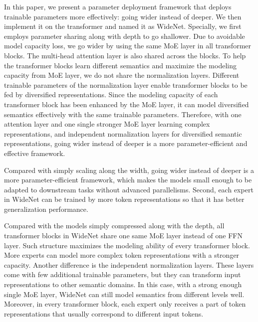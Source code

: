 \documentclass[letterpaper]{article} %
\begin{document}
In this paper, we present a parameter deployment framework that deploys trainable parameters more effectively: going wider instead of deeper. We then implement it on the transformer and named it as WideNet.  Specially, we first employs parameter sharing along with depth to go shallower. Due to avoidable model capacity loss, we go wider by using the same MoE layer in all transformer blocks. The multi-head attention layer is also shared across the blocks. To help the transformer blocks learn different semantics and maximize the modeling capacity from MoE layer, we do not share the normalization layers. Different trainable parameters of the normalization layer enable transformer blocks to be fed by diversified representations. Since the modeling capacity of each transformer block has been enhanced by the MoE layer, it can model diversified semantics effectively with the same trainable parameters. Therefore, with one attention layer and one single stronger MoE layer learning complex representations, and independent normalization layers for diversified semantic representations, going wider instead of deeper is a more parameter-efficient and effective framework. 


Compared with simply scaling along the width, going wider instead of deeper is a more parameter-efficient framework, which makes the models small enough to be adapted to downstream tasks without advanced parallelisms. Second, each expert in WideNet can be trained by more token representations so that it has better generalization performance. 


Compared with the models simply compressed along with the depth, all transformer blocks in WideNet share one same MoE layer instead of one FFN layer. Such structure maximizes the modeling ability of every transformer block. More experts can model more complex token representations with a stronger capacity. Another difference is the independent normalization layers. These layers come with few additional trainable parameters, but they can transform input representations to other semantic domains. In this case, with a strong enough single MoE layer, WideNet can still model semantics from different levels well. Moreover, in every transformer block, each expert only receives a part of token representations that usually correspond to different input tokens. 
\end{document}
